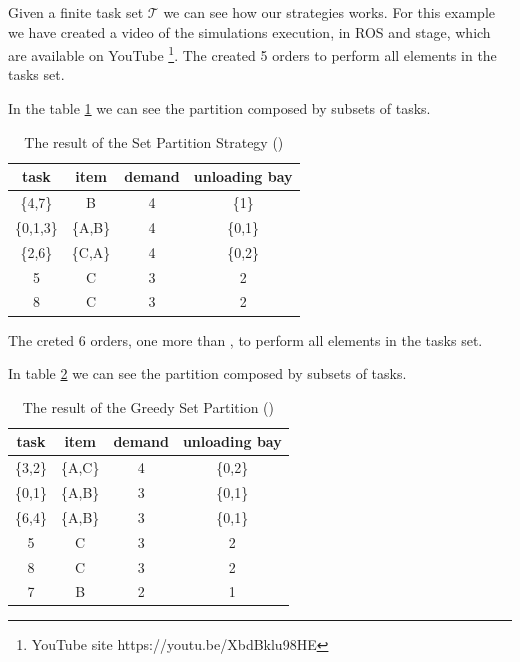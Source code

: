Given a finite task set $\mathcal{T}$ we can see how our strategies works.
For this example we have created a video of the simulations execution, in ROS and stage, which are available on YouTube \footnote{YouTube site https://youtu.be/XbdBklu98HE}.
\newpage
The \sps created 5 orders to perform all elements in the tasks set.

In the table \ref{tab:sps} we can see the partition composed by subsets of tasks.
\begin{table}[hbt]
  \begin{center}
    \begin{tabular}{|c|c|c|c|} \hline
    \textbf{task} & \textbf{item} & \textbf{demand} & \textbf{unloading bay} \\ \hline
    \{4,7\}    & B    & 4     & \{1\}             \\
    \{0,1,3\}  & \{A,B\}& 4    & \{0,1\}             \\
    \{2,6\}    & \{C,A\}    & 4  & \{0,2\}             \\
    5    & C    & 3      & 2             \\
    8    & C    & 3      & 2             \\ \hline       
    \end{tabular}
    \caption{The result of the Set Partition Strategy (\sps)}
    \label{tab:sps}
  \end{center}
\end{table}

The \gsp creted 6 orders, one more than \sps, to perform all elements in the tasks set.

In table \ref{tab:gsp} we can see the partition composed by subsets of tasks.
\begin{table}[hbt]
\begin{center}
  \begin{tabular}{|c|c|c|c|} \hline
  \textbf{task} & \textbf{item} & \textbf{demand} & \textbf{unloading bay} \\ \hline
  \{3,2\}    & \{A,C\}    & 4     & \{0,2\}             \\
  \{0,1\}    & \{A,B\}    & 3     & \{0,1\}             \\
  \{6,4\}    & \{A,B\}    & 3     & \{0,1\}             \\
  5    & C    & 3      & 2             \\
  8    & C    & 3      & 2             \\        
  7    & B    & 2      & 1             \\\hline
  \end{tabular}
  \caption{The result of the Greedy Set Partition (\gsp)}
  \label{tab:gsp}
\end{center}
\end{table}

